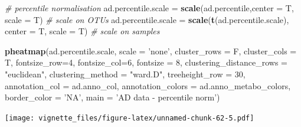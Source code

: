 \documentclass[]{book}
\newenvironment{Shaded}{\begin{snugshade}}{\end{snugshade}}
\newcommand{\KeywordTok}[1]{\textcolor[rgb]{0.13,0.29,0.53}{\textbf{#1}}}
\newcommand{\DataTypeTok}[1]{\textcolor[rgb]{0.13,0.29,0.53}{#1}}
\newcommand{\DecValTok}[1]{\textcolor[rgb]{0.00,0.00,0.81}{#1}}
\newcommand{\StringTok}[1]{\textcolor[rgb]{0.31,0.60,0.02}{#1}}
\newcommand{\CommentTok}[1]{\textcolor[rgb]{0.56,0.35,0.01}{\textit{#1}}}
\newcommand{\NormalTok}[1]{#1}
\begin{document}
\begin{Shaded}
\begin{Highlighting}[]
\CommentTok{# percentile normalisation}
\NormalTok{ad.percentile.scale =}\StringTok{ }\KeywordTok{scale}\NormalTok{(ad.percentile,}\DataTypeTok{center =}\NormalTok{ T, }\DataTypeTok{scale =}\NormalTok{ T) }\CommentTok{# scale on OTUs}
\NormalTok{ad.percentile.scale =}\StringTok{ }\KeywordTok{scale}\NormalTok{(}\KeywordTok{t}\NormalTok{(ad.percentile.scale), }\DataTypeTok{center =}\NormalTok{ T, }\DataTypeTok{scale =}\NormalTok{ T) }\CommentTok{# scale on samples}

\KeywordTok{pheatmap}\NormalTok{(ad.percentile.scale, }
         \DataTypeTok{scale =} \StringTok{'none'}\NormalTok{, }
         \DataTypeTok{cluster_rows =}\NormalTok{ F, }
         \DataTypeTok{cluster_cols =}\NormalTok{ T, }
         \DataTypeTok{fontsize_row=}\DecValTok{4}\NormalTok{, }\DataTypeTok{fontsize_col=}\DecValTok{6}\NormalTok{,}
         \DataTypeTok{fontsize =} \DecValTok{8}\NormalTok{,}
         \DataTypeTok{clustering_distance_rows =} \StringTok{"euclidean"}\NormalTok{,}
         \DataTypeTok{clustering_method =} \StringTok{"ward.D"}\NormalTok{,}
         \DataTypeTok{treeheight_row =} \DecValTok{30}\NormalTok{,}
         \DataTypeTok{annotation_col =}\NormalTok{ ad.anno_col,}
         \DataTypeTok{annotation_colors =}\NormalTok{ ad.anno_metabo_colors,}
         \DataTypeTok{border_color =} \StringTok{'NA'}\NormalTok{,}
         \DataTypeTok{main =} \StringTok{'AD data - percentile norm'}\NormalTok{)}
\end{Highlighting}
\end{Shaded}

\texttt{[image: vignette\_files/figure-latex/unnamed-chunk-62-5.pdf]}
\end{document}
